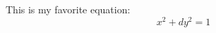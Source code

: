 \documentclass{article}
\begin{document}
This is my favorite equation:
\[
    x^{2}+dy^{2}=1
\]
\end{document}
